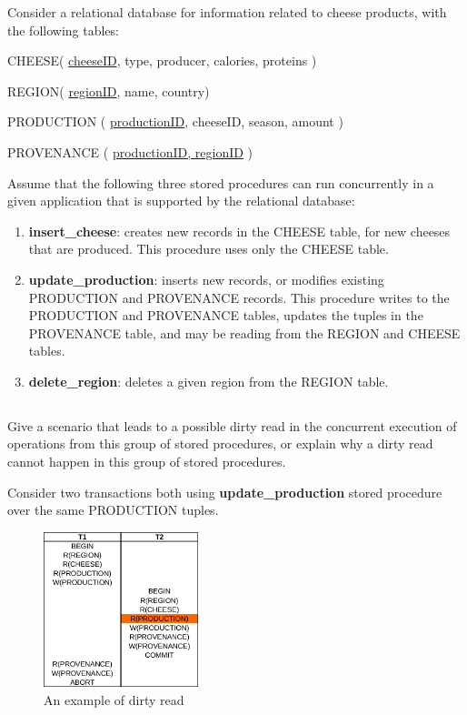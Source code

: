 {\color{gray}Consider a relational database for information related to cheese products, with the following tables:

\tab CHEESE( \underline{cheeseID}, type, producer, calories, proteins )

\tab REGION( \underline{regionID}, name, country)

\tab PRODUCTION ( \underline{productionID}, cheeseID, season, amount )

\tab PROVENANCE ( \underline{productionID, regionID} )

Assume that the following three stored procedures can run concurrently in a given application that is supported by the relational database:
\begin{enumerate}

	\item \textbf{insert\_cheese}: creates new records in the CHEESE table, for new cheeses that are produced. This procedure uses only the CHEESE table.

	\item \textbf{update\_production}: inserts new records, or modifies existing PRODUCTION and PROVENANCE records. This procedure writes to the PRODUCTION and PROVENANCE tables, updates the tuples in the PROVENANCE table, and may be reading from the REGION and CHEESE tables.

	\item \textbf{delete\_region}: deletes a given region from the REGION table.

\end{enumerate}
}

\subsection{}
{\color{gray}Give a scenario that leads to a possible dirty read in the concurrent execution of operations from this group of stored procedures, or explain why a dirty read cannot happen in this group of stored procedures.}

Consider two transactions both using \textbf{update\_production} stored procedure over the same PRODUCTION tuples.

\begin{figure}[H]
	\centering
	\includegraphics[width=0.4\textwidth]{dirty_read.png}
	\caption{An example of dirty read}
\end{figure}

